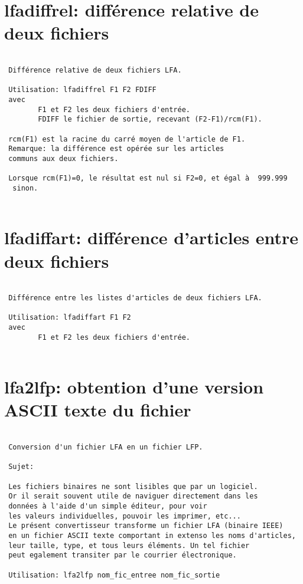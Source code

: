 \documentclass[10pt,french]{book}
\begin{document}
\section{lfadiffrel: différence relative de deux fichiers}
\begin{verbatim}
 
 Différence relative de deux fichiers LFA.
  
 Utilisation: lfadiffrel F1 F2 FDIFF
 avec
        F1 et F2 les deux fichiers d'entrée.
        FDIFF le fichier de sortie, recevant (F2-F1)/rcm(F1).
  
 rcm(F1) est la racine du carré moyen de l'article de F1.
 Remarque: la différence est opérée sur les articles
 communs aux deux fichiers.
  
 Lorsque rcm(F1)=0, le résultat est nul si F2=0, et égal à  999.999
  sinon.
  

\end{verbatim}
\section{lfadiffart: différence d'articles entre deux fichiers}
\begin{verbatim}
  
 Différence entre les listes d'articles de deux fichiers LFA.
  
 Utilisation: lfadiffart F1 F2 
 avec
        F1 et F2 les deux fichiers d'entrée.
  
\end{verbatim}

\section{lfa2lfp: obtention d'une version ASCII texte du fichier}

\begin{verbatim}
  
 Conversion d'un fichier LFA en un fichier LFP.
  
 Sujet:
  
 Les fichiers binaires ne sont lisibles que par un logiciel.
 Or il serait souvent utile de naviguer directement dans les
 données à l'aide d'un simple éditeur, pour voir
 les valeurs individuelles, pouvoir les imprimer, etc...
 Le présent convertisseur transforme un fichier LFA (binaire IEEE)
 en un fichier ASCII texte comportant in extenso les noms d'articles,
 leur taille, type, et tous leurs éléments. Un tel fichier
 peut egalement transiter par le courrier électronique.
  
 Utilisation: lfa2lfp nom_fic_entree nom_fic_sortie
\end{verbatim}
\end{document}
